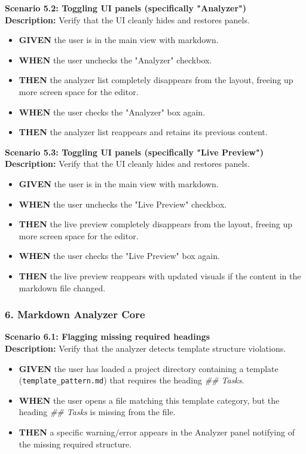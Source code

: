\documentclass[12pt, a4paper]{article}
\begin{document}
\textbf{Scenario 5.2: Toggling UI panels (specifically "Analyzer")} \\
\textbf{Description:} Verify that the UI cleanly hides and restores panels.
\begin{itemize}
    \item \textbf{GIVEN} the user is in the main view with markdown.
    \item \textbf{WHEN} the user unchecks the "Analyzer" checkbox.
    \item \textbf{THEN} the analyzer list completely disappears from the layout, freeing up more screen space for the editor.
    \item \textbf{WHEN} the user checks the "Analyzer" box again.
    \item \textbf{THEN} the analyzer list reappears and retains its previous content.
\end{itemize}

\textbf{Scenario 5.3: Toggling UI panels (specifically "Live Preview")} \\
\textbf{Description:} Verify that the UI cleanly hides and restores panels.
\begin{itemize}
    \item \textbf{GIVEN} the user is in the main view with markdown.
    \item \textbf{WHEN} the user unchecks the "Live Preview" checkbox.
    \item \textbf{THEN} the live preview completely disappears from the layout, freeing up more screen space for the editor.
    \item \textbf{WHEN} the user checks the "Live Preview" box again.
    \item \textbf{THEN} the live preview reappears with updated visuals if the content in the markdown file changed.
\end{itemize}

\subsubsection*{6. Markdown Analyzer Core}

\textbf{Scenario 6.1: Flagging missing required headings} \\
\textbf{Description:} Verify that the analyzer detects template structure violations.
\begin{itemize}
    \item \textbf{GIVEN} the user has loaded a project directory containing a template (\texttt{template\_pattern.md}) that requires the heading \textit{\#\# Tasks}.
    \item \textbf{WHEN} the user opens a file matching this template category, but the heading \textit{\#\# Tasks} is missing from the file.
    \item \textbf{THEN} a specific warning/error appears in the Analyzer panel notifying of the missing required structure.
\end{itemize}
\end{document}
